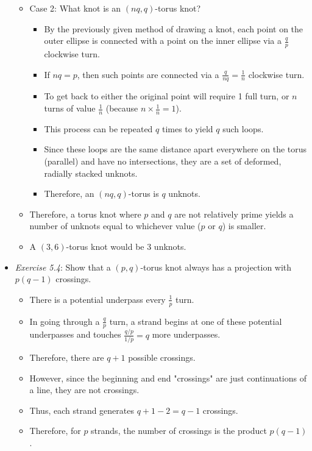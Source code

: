 \documentclass[titlepage]{article}
\numberwithin{figure}{section}
\numberwithin{table}{section}
\numberwithin{equation}{section}
\begin{document}
\begin{itemize}
\begin{itemize}
\begin{itemize}
        \end{itemize}
        \item Case 2: What knot is an $(nq,q)$-torus knot?
        \begin{itemize}
            \item By the previously given method of drawing a knot, each point on the outer ellipse is connected with a point on the inner ellipse via a $\frac{q}{p}$ clockwise turn.
            \item If $nq=p$, then such points are connected via a $\frac{q}{nq}=\frac{1}{n}$ clockwise turn.
            \item To get back to either the original point will require 1 full turn, or $n$ turns of value $\frac{1}{n}$ (because $n\times\frac{1}{n}=1$).
            \item This process can be repeated $q$ times to yield $q$ such loops.
            \item Since these loops are the same distance apart everywhere on the torus (parallel) and have no intersections, they are a set of deformed, radially stacked unknots.
            \item Therefore, an $(nq,q)$-torus is $q$ unknots.
        \end{itemize}
        \item Therefore, a torus knot where $p$ and $q$ are not relatively prime yields a number of unknots equal to whichever value ($p$ or $q$) is smaller.
        \item A $(3,6)$-torus knot would be 3 unknots.
    \end{itemize}
    \item \emph{Exercise 5.4}: Show that a $(p,q)$-torus knot always has a projection with $p(q-1)$ crossings.
    \begin{itemize}
        \item There is a potential underpass every $\frac{1}{p}$ turn.
        \item In going through a $\frac{q}{p}$ turn, a strand begins at one of these potential underpasses and touches $\frac{q/p}{1/p}=q$ more underpasses.
        \item Therefore, there are $q+1$ possible crossings.
        \item However, since the beginning and end "crossings" are just continuations of a line, they are not crossings.
        \item Thus, each strand generates $q+1-2=q-1$ crossings.
        \item Therefore, for $p$ strands, the number of crossings is the product $p(q-1)$.

\end{itemize}
\end{itemize}
\end{document}
